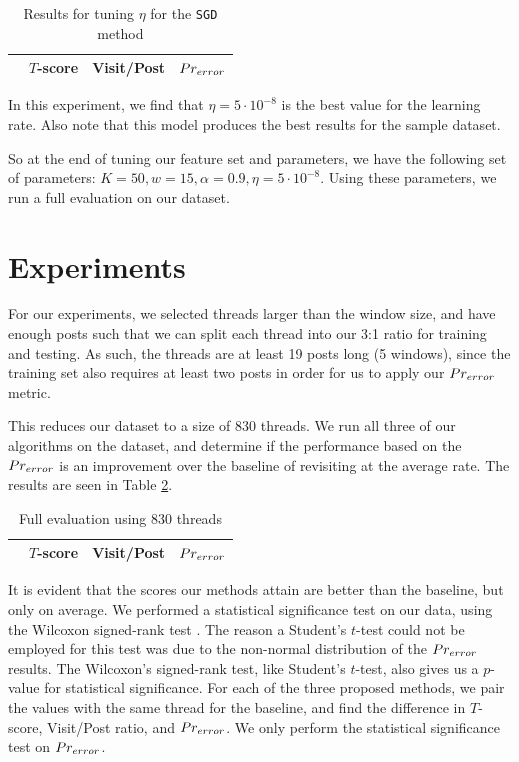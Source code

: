 \begin{table}
	\footnotesize
\begin{center}
\begin{tabular}{| l | c | c | c |}
\hline
& $T$-score			   &	Visit/Post & 	$Pr_{error}$\\
\hline
	
\hline
\end{tabular}
\end{center}
\caption{Results for tuning $\eta$ for the \texttt{SGD}
method}\label{tbl:par_tune_learning}
\end{table}

In this experiment, we find that $\eta=5\cdot10^{-8}$ is the best value for the 
learning rate. Also note that this model produces the best results for the 
sample dataset.


So at the end of tuning our feature set and parameters, we have the following 
set of parameters: $K = 50, w = 15, \alpha = 0.9, \eta = 5\cdot10^{-8}$. Using 
these parameters, we run a full evaluation on our dataset.

\section{Experiments}
For our experiments, we selected threads larger than the window size, and have 
enough posts such that we can split each thread into our 3:1 ratio for training 
and testing. As such, the threads are at least 19 posts long (5 windows), since 
the training set also requires at least two posts in order for us to apply our 
$Pr_{error}$ metric.

This reduces our dataset to a size of 830 threads. We run all three of our 
algorithms on the dataset, and determine if the performance based on the 
$Pr_{error}$ is an improvement over the baseline of revisiting at the average 
rate. The results are seen in Table \ref{tbl:full_eval}.
\begin{table}
	\footnotesize
\begin{center}
\begin{tabular}{| l | c | c | c |}
\hline
& $T$-score			   &	Visit/Post & 	$Pr_{error}$\\
\hline
	
\hline
\end{tabular}
\end{center}
\caption{Full evaluation using 830 threads}\label{tbl:full_eval}
\end{table}

It is evident that the scores our methods attain are better than the baseline, 
but only on average. We performed a statistical significance test on our data, 
using the Wilcoxon signed-rank test \cite{wilcoxon1945}. The reason a Student's 
$t$-test could not be employed for this test was due to the non-normal 
distribution of the $Pr_{error}$ results. The Wilcoxon's signed-rank test, like 
Student's $t$-test, also gives us a $p$-value for statistical significance. For 
each of the three proposed methods, we pair the values with the same thread for 
the baseline, and find the difference in $T$-score, Visit/Post ratio, and 
$Pr_{error}$. We only perform the statistical significance test on $Pr_{error}$.

